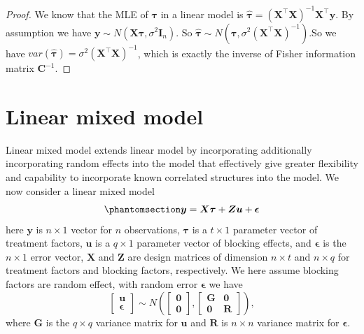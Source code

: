 \documentclass[
  a4paper,
  oneside,
  openany,
  12pt,
  onecolumn]{book}
\theoremstyle{definition}
\theoremstyle{plain}
\theoremstyle{remark}
\begin{document}
\begin{proof}
We know that the MLE of \(\boldsymbol{\tau}\) in a linear model is
\(\hat{\boldsymbol{\tau}}=(\boldsymbol{X}^\top\boldsymbol{X})^{-1}\boldsymbol{X}^\top\boldsymbol{y}\).
By assumption we have
\(\boldsymbol{y} \sim N(\mathbf{X}\boldsymbol{\tau}, \sigma^2\mathbf{I}_n)\).
So
\(\hat{\boldsymbol{\tau}}\sim N(\boldsymbol{\tau},\sigma^2(\boldsymbol{X}^\top\boldsymbol{X})^{-1})\).So
we have
\(var(\hat{\boldsymbol{\tau}}) = \sigma^2(\boldsymbol{X}^\top\boldsymbol{X})^{-1}\),
which is exactly the inverse of Fisher information matrix
\(\mathbf{C}^{-1}\).
\end{proof}

\section{Linear mixed model}\label{linear-mixed-model}

Linear mixed model extends linear model by incorporating additionally
incorporating random effects into the model that effectively give
greater flexibility and capability to incorporate known correlated
structures into the model. We now consider a linear mixed model
\begin{equation}\phantomsection\label{eq-lmm}{
\boldsymbol{y}=\boldsymbol{X}\boldsymbol{\tau}+\boldsymbol{Z}\boldsymbol{u}+\boldsymbol{\epsilon}
}\end{equation} here \(\boldsymbol{y}\) is \(n\times 1\) vector for
\(n\) observations, \(\boldsymbol{\tau}\) is a \(t\times1\) parameter
vector of treatment factors, \(\boldsymbol{u}\) is a \(q \times1\)
parameter vector of blocking effects, and \(\boldsymbol{\epsilon}\) is
the \(n\times 1\) error vector, \(\boldsymbol{X}\) and
\(\boldsymbol{Z}\) are design matrices of dimension \(n \times t\) and
\(n \times q\) for treatment factors and blocking factors, respectively.
We here assume blocking factors are random effect, with random error
\(\boldsymbol{\epsilon}\) we have \[
\begin{bmatrix}
\boldsymbol{u} \\
\boldsymbol{\epsilon} 
\end{bmatrix}
\sim
N\left(
\begin{bmatrix}
\boldsymbol{0} \\
\boldsymbol{0}
\end{bmatrix}
,
\begin{bmatrix}
\boldsymbol{G} & \mathbf{0} \\
\mathbf{0} & \boldsymbol{R}
\end{bmatrix}
\right),
\] where \(\boldsymbol{G}\) is the \(q \times q\) variance matrix for
\(\boldsymbol{u}\) and \(\boldsymbol{R}\) is \(n\times n\) variance
matrix for \(\boldsymbol{\epsilon}\).
\end{document}
